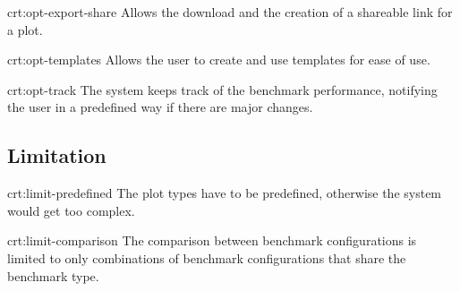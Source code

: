{crt:opt-export-share}
{Allows the download and the creation of a shareable link for a \gls{plot}.}

{crt:opt-templates}
{Allows the \gls{user} to create and use \glspl{template} for ease of use.}

{crt:opt-track}
{The system keeps track of the benchmark performance, notifying the \gls{user} in a predefined way if there are major changes.}


\subsection{Limitation}

{crt:limit-predefined}
{The \gls{plot} types have to be predefined, otherwise the system would get too complex.}

{crt:limit-comparison}
{The comparison between \glspl{benchmark configuration} is limited to only combinations of \glspl{benchmark configuration} that share the benchmark type.}


